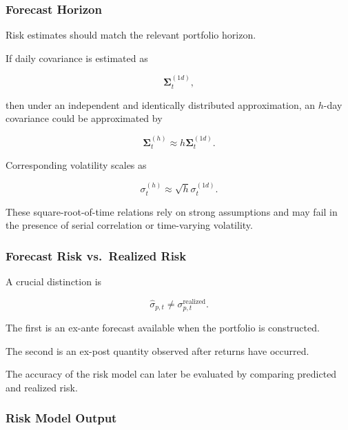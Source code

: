 \documentclass[11pt,a4paper]{article}
\begin{document}
\subsubsection{Forecast Horizon}

Risk estimates should match the relevant portfolio horizon.

If daily covariance is estimated as

\begin{equation}
\boldsymbol{\Sigma}_t^{(1d)},
\end{equation}

then under an independent and identically distributed approximation, an
$h$-day covariance could be approximated by

\begin{equation}
\boxed{
\boldsymbol{\Sigma}_t^{(h)}
\approx
h
\boldsymbol{\Sigma}_t^{(1d)}.
}
\end{equation}

Corresponding volatility scales as

\begin{equation}
\boxed{
\sigma_t^{(h)}
\approx
\sqrt{h}
\sigma_t^{(1d)}.
}
\end{equation}

These square-root-of-time relations rely on strong assumptions and may fail in
the presence of serial correlation or time-varying volatility.


\subsubsection{Forecast Risk vs.\ Realized Risk}

A crucial distinction is

\begin{equation}
\boxed{
\widehat{\sigma}_{p,t}
\neq
\sigma_{p,t}^{\mathrm{realized}}.
}
\end{equation}

The first is an ex-ante forecast available when the portfolio is constructed.

The second is an ex-post quantity observed after returns have occurred.

The accuracy of the risk model can later be evaluated by comparing predicted
and realized risk.


\subsubsection{Risk Model Output}
\end{document}
